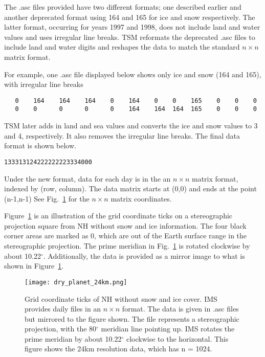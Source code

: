 The .asc files provided have two different formats; one described earlier and another deprecated format using 164 and 165 for ice and snow respectively. The latter format, occurring for years 1997 and 1998, does not include land and water values and uses irregular line breaks. TSM reformats the deprecated .asc files to include land and water digits and reshapes the data to match the standard $n \times n$ matrix format. 

For example, one .asc file displayed below shows only ice and snow (164 and 165), with irregular line breaks
\begin{verbatim}
   0    164    164    164    0    164    0    0    165    0    0    0  
   0    0      0      0      0    164    164  164  165    0    0    0  
\end{verbatim}
TSM later adds in land and sea values and converts the ice and snow values to 3 and 4, respectively. It also removes the irregular line breaks. The final data format is  shown below.
\begin{verbatim}
133313124222222223334000
\end{verbatim}
Under the new format, data for each day is in the an $n\times n$ matrix format, indexed by (row, column). The data matrix starts at (0,0) and ends at the point (n-1,n-1) See Fig.~\ref{fig:dry earth} for the $n\times n$ matrix coordinates.

Figure~\ref{fig:dry earth} is an illustration of the grid coordinate ticks on a stereographic projection square from NH without snow and ice information. The four black corner areas are marked as 0, which are out of the Earth surface range in the stereographic projection. The prime meridian in Fig.~\ref{fig:dry earth} is rotated clockwise by about 10.22$^{\circ}$. Additionally, the data is provided as a mirror image to what is shown in Figure~\ref{fig:dry earth}.
\begin{figure}[ht]
\centering
\begin{minipage}{4.0in}
\texttt{[image: dry\_planet\_24km.png]}
\caption{Grid coordinate ticks of NH without snow and ice cover. IMS provides daily files in an $n \times n$ format. The data is given in .asc files but mirrored to the figure shown. The file represents a stereographic projection, with the 80$^{\circ}$ meridian line pointing up. IMS rotates the prime meridian by about 10.22$^{\circ}$ clockwise to the horizontal. This figure shows the 24km resolution data, which has n = 1024.}
\label{fig:dry earth}
\end{minipage}
\end{figure}

